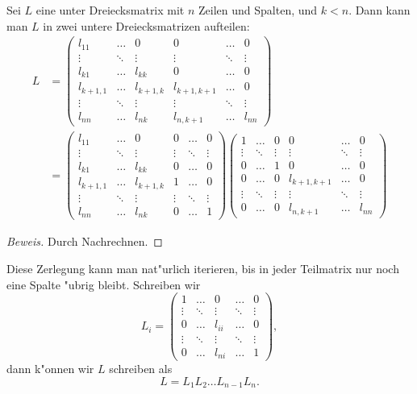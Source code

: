 \begin{hilfssatz}
Sei $L$ eine unter Dreiecksmatrix mit $n$ Zeilen und Spalten, und $k<n$.
Dann kann man $L$ in zwei untere Dreiecksmatrizen aufteilen:
\begin{align*}
L&=
\begin{pmatrix}
l_{11}   &\dots &0        &0          &\dots &0     \\
\vdots   &\ddots&\vdots   &\vdots     &\ddots&\vdots\\
l_{k1}   &\dots &l_{kk}   &0          &\dots &0     \\
l_{k+1,1}&\dots &l_{k+1,k}&l_{k+1,k+1}&\dots &0     \\
\vdots   &\ddots&\vdots   &\vdots     &\ddots&\vdots\\
l_{nn}   &\dots &l_{nk}   &l_{n,k+1}  &\dots &l_{nn}
\end{pmatrix}
\\
&=
\begin{pmatrix}
l_{11}   &\dots &0        &0          &\dots &0     \\
\vdots   &\ddots&\vdots   &\vdots     &\ddots&\vdots\\
l_{k1}   &\dots &l_{kk}   &0          &\dots &0     \\
l_{k+1,1}&\dots &l_{k+1,k}&1          &\dots &0     \\
\vdots   &\ddots&\vdots   &\vdots     &\ddots&\vdots\\
l_{nn}   &\dots &l_{nk}   &0          &\dots &1
\end{pmatrix}
\begin{pmatrix}
1        &\dots &0        &0          &\dots &0     \\
\vdots   &\ddots&\vdots   &\vdots     &\ddots&\vdots\\
0        &\dots &1        &0          &\dots &0     \\
0        &\dots &0        &l_{k+1,k+1}&\dots &0     \\
\vdots   &\ddots&\vdots   &\vdots     &\ddots&\vdots\\
0        &\dots &0        &l_{n,k+1}  &\dots &l_{nn}
\end{pmatrix}
\end{align*}
\end{hilfssatz}

\begin{proof}[Beweis]
Durch Nachrechnen.
\end{proof}

Diese Zerlegung kann man nat"urlich iterieren, bis in jeder Teilmatrix
nur noch eine Spalte "ubrig bleibt.
Schreiben wir
\[
L_i=\begin{pmatrix}
1      &\dots &0     &\dots &0     \\
\vdots &\ddots&\vdots&\ddots&\vdots\\
0      &\dots &l_{ii}&\dots &0     \\
\vdots &\ddots&\vdots&\ddots&\vdots\\
0      &\dots &l_{ni}&\dots &1
\end{pmatrix},
\]
dann k"onnen wir $L$ schreiben als
\begin{equation}
L=L_1L_2\dots L_{n-1}L_n.
\label{lproductdecomposition}
\end{equation}

